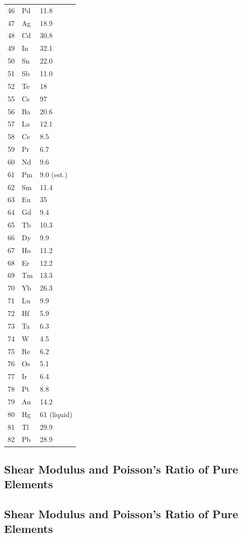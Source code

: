 \documentclass[12pt,a4paper]{article}
\begin{document}
\begin{longtable}{p{0.6cm}p{1.2cm}p{1.5cm}}
		46 & Pd & 11.8 \\
		47 & Ag & 18.9 \\
		48 & Cd & 30.8 \\
		49 & In & 32.1 \\
		50 & Sn & 22.0 \\
		51 & Sb & 11.0 \\
		52 & Te & 18 \\
		55 & Cs & 97 \\
		56 & Ba & 20.6 \\
		57 & La & 12.1 \\
		58 & Ce & 8.5 \\
		59 & Pr & 6.7 \\
		60 & Nd & 9.6 \\
		61 & Pm & 9.0 (est.) \\
		62 & Sm & 11.4 \\
		63 & Eu & 35 \\
		64 & Gd & 9.4 \\
		65 & Tb & 10.3 \\
		66 & Dy & 9.9 \\
		67 & Ho & 11.2 \\
		68 & Er & 12.2 \\
		69 & Tm & 13.3 \\
		70 & Yb & 26.3 \\
		71 & Lu & 9.9 \\
		72 & Hf & 5.9 \\
		73 & Ta & 6.3 \\
		74 & W  & 4.5 \\
		75 & Re & 6.2 \\
		76 & Os & 5.1 \\
		77 & Ir & 6.4 \\
		78 & Pt & 8.8 \\
		79 & Au & 14.2 \\
		80 & Hg & 61 (liquid) \\
		81 & Tl & 29.9 \\
		82 & Pb & 28.9 \\
	\end{longtable}
	
	\subsection{Shear Modulus and Poisson's Ratio of Pure Elements}
	\label{subsec:elastic-constants}
	
	\subsection{Shear Modulus and Poisson's Ratio of Pure Elements}
	\label{subsec:elastic-constants}
	
\end{document}
